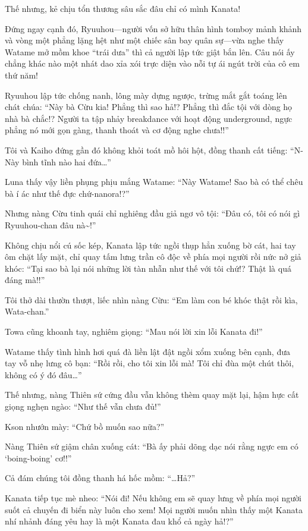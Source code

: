 \documentclass[../main.tex]{subfiles}
\begin{document}
Thế nhưng, kẻ chịu tổn thương sâu sắc đâu chỉ có mình Kanata!

Đứng ngay cạnh đó, Ryuuhou—người vốn sở hữu thân hình tomboy mảnh khảnh và vòng một phẳng lặng hệt như một chiếc sân bay quân sự—vừa nghe thấy Watame mở mồm khoe ``trái dưa'' thì cả người lập tức giật bắn lên. Câu nói ấy chẳng khác nào một nhát dao xỉa xói trực diện vào nỗi tự ái ngút trời của cô em thứ năm!

Ryuuhou lập tức chống nanh, lông mày dựng ngược, trừng mắt gắt toáng lên chát chúa: ``Này bà Cừu kia! Phẳng thì sao hả!? Phẳng thì đắc tội với dòng họ nhà bà chắc!? Người ta tập nhảy breakdance với hoạt động underground, ngực phẳng nó mới gọn gàng, thanh thoát và cơ động nghe chưa!!''

Tôi và Kaiho đứng gần đó không khỏi toát mồ hôi hột, đồng thanh cất tiếng: ``N-Này bình tĩnh nào hai đứa\dots''

Luna thấy vậy liền phụng phịu mắng Watame: ``Này Watame! Sao bà có thể chêu bà í ác như thế đực chứ-nanora!?''

Nhưng nàng Cừu tinh quái chỉ nghiêng đầu giả ngơ vô tội: ``Đâu có, tôi có nói gì Ryuuhou-chan đâu nà\~{}!''

Không chịu nổi cú sốc kép, Kanata lập tức ngồi thụp hẳn xuống bờ cát, hai tay ôm chặt lấy mặt, chỉ quay tấm lưng trần cô độc về phía mọi người rồi nức nở giả khóc: ``Tại sao bà lại nói những lời tàn nhẫn như thế với tôi chứ!? Thật là quá đáng mà!!''

Tôi thở dài thườn thượt, liếc nhìn nàng Cừu: ``Em làm con bé khóc thật rồi kìa, Wata-chan.''

Towa cũng khoanh tay, nghiêm giọng: ``Mau nói lời xin lỗi Kanata đi!''

Watame thấy tình hình hơi quá đà liền lật đật ngồi xổm xuống bên cạnh, đưa tay vỗ nhẹ lưng cô bạn: ``Rồi rồi, cho tôi xin lỗi mà! Tôi chỉ đùa một chút thôi, không có ý đó đâu\dots''

Thế nhưng, nàng Thiên sứ cứng đầu vẫn không thèm quay mặt lại, hậm hực cất giọng nghẹn ngào: ``Như thế vẫn chưa đủ!''

Kson nhướn mày: ``Chứ bồ muốn sao nữa?''

Nàng Thiên sứ giậm chân xuống cát: ``Bà ấy phải dõng dạc nói rằng ngực em có `boing-boing' cơ!!''

Cả đám chúng tôi đồng thanh há hốc mồm: ``\dots Hả?''

Kanata tiếp tục mè nheo: ``Nói đi! Nếu không em sẽ quay lưng về phía mọi người suốt cả chuyến đi biển này luôn cho xem! Mọi người muốn nhìn thấy một Kanata nhí nhảnh đáng yêu hay là một Kanata đau khổ cả ngày hả!?''
\end{document}
